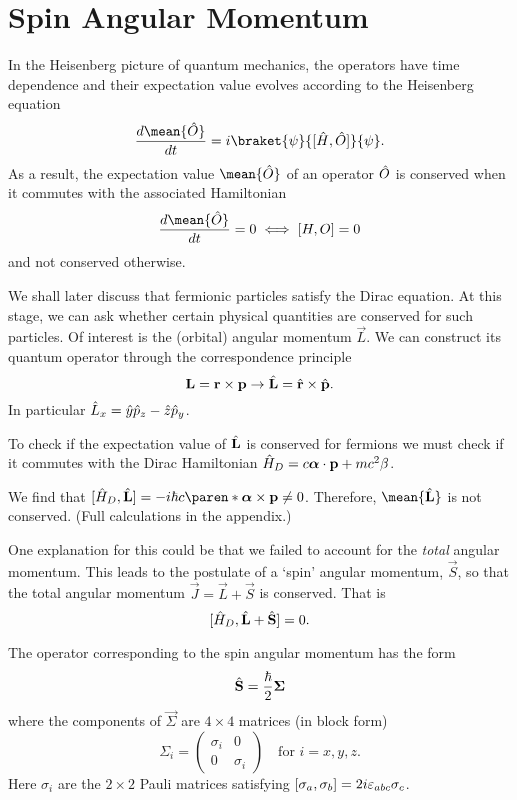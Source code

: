 \documentclass[11pt]{penrose}
\begin{document}
\section{Spin Angular Momentum}
In the Heisenberg picture of quantum mechanics, the operators have time dependence and their expectation value evolves according to the Heisenberg equation
\begin{equation}
    \frac{d \mean{\qop{O}}}{dt} = i \braket{\psi}{\comm{\qop{H}, \qop{O}}}{\psi}.
\end{equation}
As a result, the expectation value $\mean{\qop{O}}$ of an operator $\hat{O}$ is conserved when it commutes with the associated Hamiltonian
\begin{equation}
    \frac{d \mean{\qop{O}}}{dt} = 0 \iff \comm{H, O} = 0
\end{equation}
and not conserved otherwise.

We shall later discuss that fermionic particles satisfy the Dirac equation. At this stage, we can ask whether certain physical quantities are conserved for such particles. Of interest is the (orbital) angular momentum $\vec{L}$. We can construct its quantum operator through the correspondence principle
\begin{equation}
    \boldsymbol{\mathbf{L}} = \boldsymbol{\mathbf{r}} \times \boldsymbol{\mathbf{p}} \to \hat{\boldsymbol{\mathbf{L}}} = \hat{\boldsymbol{\mathbf{r}}} \times \hat{\boldsymbol{\mathbf{p}}}.
\end{equation}
In particular $\hat{L}_x = \hat{y} \hat{p}_z - \hat{z} \hat{p}_y$.

To check if the expectation value of $\hat{\boldsymbol{\mathbf{L}}}$ is conserved for fermions we must check if it commutes with the Dirac Hamiltonian $\hat{H}_D = c \boldsymbol{\mathbf{\alpha}} \cdot \boldsymbol{\mathbf{p}} + m c^2 \beta$.

We find that $\comm{ \qop{H}_D, \qop{\vec{L}} } = -i \hbar c \paren*{\vec{\alpha} \times \vec{p}} \neq 0$. Therefore, $\mean{\qop{\vec{L}}}$ is not conserved. (Full calculations in the appendix.)

One explanation for this could be that we failed to account for the \emph{total} angular momentum. This leads to the postulate of a `spin' angular momentum, $\vec{S}$, so that the total angular momentum $\vec{J} = \vec{L} + \vec{S}$ is conserved. That is
\begin{equation}
    \lbrack\hat{H}_D, \hat{\boldsymbol{\mathbf{L}}} + \hat{\boldsymbol{\mathbf{S}}}\rbrack = 0.
\end{equation}

The operator corresponding to the spin angular momentum has the form
\begin{equation}
    \hat{\boldsymbol{\mathbf{S}}} = \frac{\hbar}{2} \boldsymbol{\mathbf{\Sigma}}
\end{equation}
where the components of $\vec{\Sigma}$ are $4\times4$ matrices (in block form) 
\begin{equation}
    \Sigma_i =
    \begin{pmatrix}
    \sigma_i & 0 \\ 0 & \sigma_i
    \end{pmatrix}
    \quad\text{for } i = x, y, z.
\end{equation}
Here $\sigma_i$ are the $2 \times 2$ Pauli matrices satisfying $\lbrack\sigma_a, \sigma_b\rbrack = 2i \varepsilon_{abc} \sigma_c$.
\end{document}
